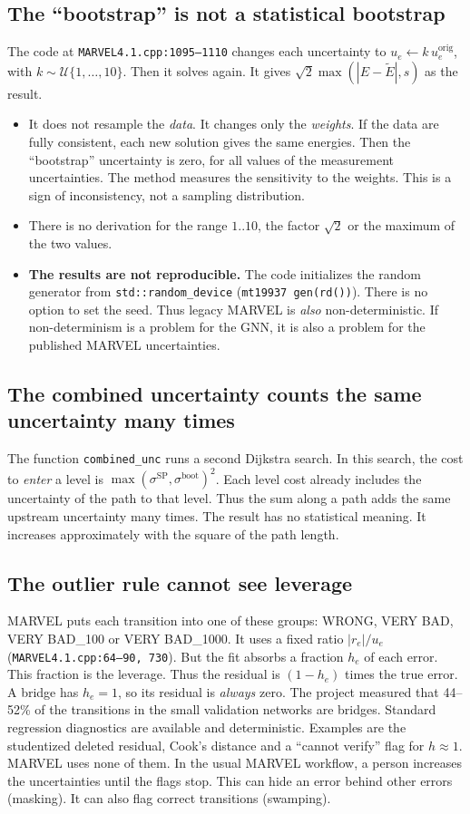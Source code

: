 \documentclass[11pt,a4paper]{article}
\newcommand{\code}[1]{\texttt{#1}}
\begin{document}
\subsection{The ``bootstrap'' is not a statistical bootstrap}
The code at \code{MARVEL4.1.cpp:1095--1110} changes each uncertainty to
$u_e \leftarrow k\,u_e^{\mathrm{orig}}$, with $k \sim \mathcal U\{1,\dots,10\}$. Then it
solves again. It gives $\sqrt2\max(|E-\tilde E|, s)$ as the result.
\begin{itemize}
\item It does not resample the \emph{data}. It changes only the \emph{weights}. If
  the data are fully consistent, each new solution gives the same energies. Then the
  ``bootstrap'' uncertainty is zero, for all values of the measurement uncertainties.
  The method measures the sensitivity to the weights. This is a sign of
  inconsistency, not a sampling distribution.
\item There is no derivation for the range $1..10$, the factor $\sqrt2$ or the
  maximum of the two values.
\item \textbf{The results are not reproducible.} The code initializes the random
  generator from \code{std::random\_device} (\code{mt19937 gen(rd())}). There is no
  option to set the seed. Thus legacy MARVEL is \emph{also} non-deterministic. If
  non-determinism is a problem for the GNN, it is also a problem for the published
  MARVEL uncertainties.
\end{itemize}

\subsection{The combined uncertainty counts the same uncertainty many times}
The function \code{combined\_unc} runs a second Dijkstra search. In this search, the
cost to \emph{enter} a level is $\max(\sigma^{\mathrm{SP}}, \sigma^{\mathrm{boot}})^2$.
Each level cost already includes the uncertainty of the path to that level. Thus the
sum along a path adds the same upstream uncertainty many times. The result has no
statistical meaning. It increases approximately with the square of the path length.

\subsection{The outlier rule cannot see leverage}
MARVEL puts each transition into one of these groups: WRONG, VERY BAD,
VERY BAD\_100 or VERY BAD\_1000. It uses a fixed ratio $|r_e|/u_e$
(\code{MARVEL4.1.cpp:64--90, 730}). But the fit absorbs a fraction $h_e$ of each
error. This fraction is the leverage. Thus the residual is $(1-h_e)$ times the true
error. A bridge has $h_e = 1$, so its residual is \emph{always} zero. The project
measured that 44--52\% of the transitions in the small validation networks are
bridges.
Standard regression diagnostics are available and deterministic. Examples are the
studentized deleted residual, Cook's distance and a ``cannot verify'' flag for
$h \approx 1$. MARVEL uses none of them. In the usual MARVEL workflow, a person
increases the uncertainties until the flags stop. This can hide an error behind other
errors (masking). It can also flag correct transitions (swamping).
\end{document}
